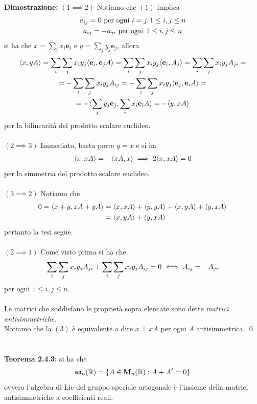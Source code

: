 \documentclass{article}
\begin{document}
\textbf{Dimostrazione:} $(1 \implies 2)$ Notiamo che $(1)$ implica
\begin{gather}
    a_{ij} = 0 \text{ per ogni } i = j, 1 \leq i, j \leq n \notag \\
    a_{ij} = - a_{ji} \text{ per ogni } 1 \leq i, j \leq n \notag
\end{gather}
si ha che $x = \sum_i x_i \mathbf{e}_i$ e $y = \sum_j y_j \mathbf{e}_j$, allora
\begin{gather}
    \langle x, yA \rangle = \sum_i \sum_j x_iy_j \langle \mathbf{e}_i, \mathbf{e}_jA \rangle = \sum_i \sum_j x_iy_j \langle \mathbf{e}_i, A_j \rangle \notag = \sum_i \sum_j x_iy_jA_{ji} = \notag \\
    = - \sum_i \sum_j x_iy_j A_{ij} = -\sum_i \sum_j x_iy_j \langle \mathbf{e}_j, \mathbf{e}_iA \rangle = \notag \\
    = -\langle \sum_j y_j\mathbf{e}_j, \sum_i x_i\mathbf{e}_i A \rangle = -\langle y, xA \rangle \notag
\end{gather}
per la bilinearità del prodotto scalare euclideo. \\ \\
$(2 \implies 3)$ Immediato, basta porre $y = x$ e si ha
\begin{gather}
    \langle x, xA \rangle = - \langle xA, x \rangle \implies 2\langle x, xA \rangle = 0 \notag
\end{gather}
per la simmetria del prodotto scalare euclideo. \\ \\
$(3 \implies 2)$ Notiamo che
\begin{align}
    0 = \langle x + y, xA + yA \rangle &= \langle x, xA \rangle + \langle y, yA \rangle + \langle x, yA \rangle + \langle y, xA \rangle \notag \\
    &= \langle x, yA \rangle + \langle y, xA \rangle \notag
\end{align}
pertanto la tesi segue. \\ \\
$(2 \implies 1)$ Come visto prima si ha che
\begin{gather}
    \sum_i \sum_j x_iy_j A_{ji} + \sum_i \sum_j x_iy_j A_{ij} = 0 \iff A_{ij} = -A_{ji} \notag
\end{gather}
per ogni $1 \leq i, j \leq n$. \\ \\
Le matrici che soddisfano le proprietà sopra elencate sono dette \textit{matrici antisimmetriche}. \\
Notiamo che la $(3)$ è equivalente a dire $x \perp xA$ per ogni $A$ antisimmetrica. \qed \\ \\ \\
\textbf{Teorema 2.4.3:} si ha che
\begin{gather}
    \mathfrak{so}_n(\mathbb{R}) = \{ A \in \mathbf{M}_n(\mathbb{R}) : A + A^t = 0 \} \notag
\end{gather}
ovvero l'algebra di Lie del gruppo speciale ortogonale è l'insieme della matrici antisimmetriche a coefficienti reali. \\
\end{document}
